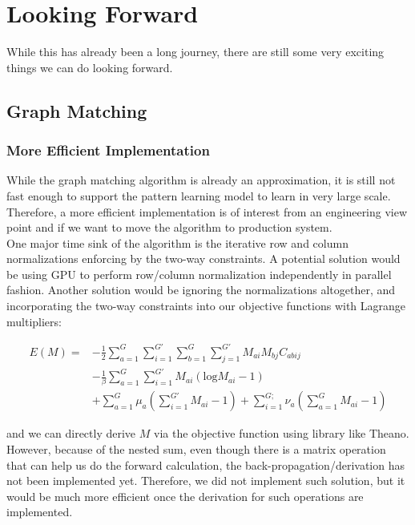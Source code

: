 \chapter{Looking Forward}

While this has already been a long journey, there are still some very exciting things we can do looking forward.

\section{Graph Matching}

\subsection{More Efficient Implementation}

While the graph matching algorithm is already an approximation, it is still not fast enough to support the pattern learning model to learn in very large scale. Therefore, a more efficient implementation is of interest from an engineering view point and if we want to move the algorithm to production system.\\

One major time sink of the algorithm is the iterative row and column normalizations enforcing by the two-way constraints. A potential solution would be using GPU to perform row/column normalization independently in parallel fashion. Another solution would be ignoring the normalizations altogether, and incorporating the two-way constraints into our objective functions with Lagrange multipliers:

\begin{align}
E(M)=&-\frac{1}{2}\sum_{a=1}^{G}\sum_{i=1}^{G'}\sum_{b=1}^{G}\sum_{j=1}^{G'}M_{ai}M_{bj}C_{abij}\nonumber\\
&-\frac{1}{\beta}\sum_{a=1}^{G}\sum_{i=1}^{G'}M_{ai}(\text{log}M_{ai}-1)\nonumber\\
&+\sum_{a=1}^{G}\mu_a(\sum_{i=1}^{G'}M_{ai}-1)+\sum_{i=1}^{G;}\nu_a(\sum_{a=1}^{G}M_{ai}-1)
\end{align}

and we can directly derive $M$ via the objective function using library like Theano\footnotemark. However, because of the nested sum, even though there is a matrix operation that can help us do the forward calculation, the back-propagation/derivation has not been implemented yet. Therefore, we did not implement such solution, but it would be much more efficient once the derivation for such operations are implemented.\\

